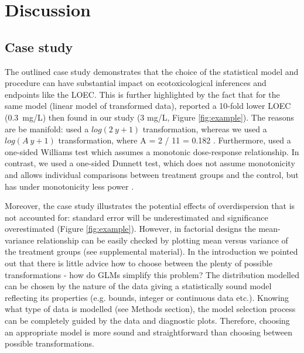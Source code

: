 \documentclass[twocolumn, natbib]{svjour3}
\begin{document}
\section{Discussion}
\label{sec:disc}
\subsection{Case study}
The outlined case study demonstrates that the choice of the statistical model and procedure can have substantial impact on ecotoxicological inferences and endpoints like the LOEC.
This is further highlighted by the fact that for the same model (linear model of transformed data), \citet{brock_minimum_2015} reported a 10-fold lower LOEC (\mbox{0.3 mg/L}) then found in our study (3 mg/L, Figure \ref{fig:example}).
The reasons are be manifold: \citep{brock_minimum_2015} used a $log(2~y + 1)$ transformation, whereas we used a $log(A~y + 1)$ transformation, where A = 2 / 11 = 0.182 \citep{van_den_brink_impact_2000}.
Furthermore, \citet{brock_minimum_2015} used a one-sided Williams test which assumes a monotonic dose-response relationship.
In contrast, we used a one-sided Dunnett test, which does not assume monotonicity and allows individual comparisons between treatment groups and the control, but has under monotonicity less power \citep{jaki_statistical_2013}.


Moreover, the case study illustrates the potential effects of overdispersion that is not accounted for: standard error will be underestimated and significance overestimated (Figure \ref{fig:example}).
However, in factorial designs the mean-variance relationship can be easily checked by plotting mean versus variance of the treatment groups (see supplemental material).
In the introduction we pointed out that there is little advice how to choose between the plenty of possible transformations - how do GLMs simplify this problem?
The distribution modelled can be chosen by the nature of the data giving a statistically sound model reflecting its properties (e.g. bounds, integer or continuous data etc.).
Knowing what type of data is modelled (see Methods section), the model selection process can be completely guided by the data and diagnostic plots. Therefore, choosing an appropriate model is more sound and straightforward than choosing between possible transformations.
\end{document}
